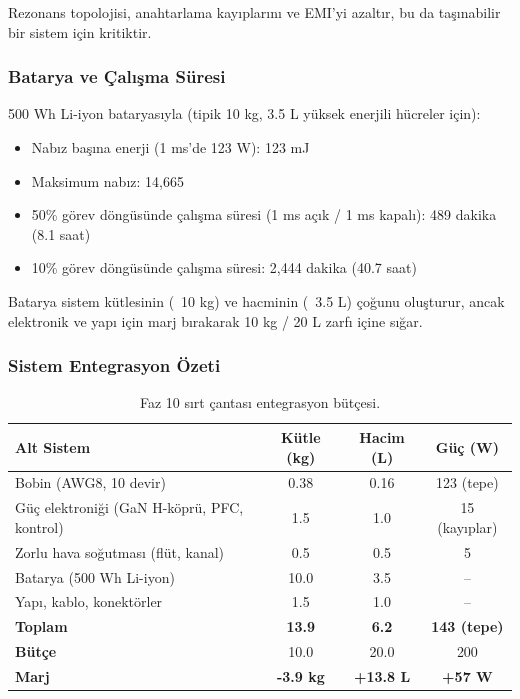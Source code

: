 Rezonans topolojisi, anahtarlama kayıplarını ve EMI'yi azaltır, bu da taşınabilir bir sistem için kritiktir.

\subsubsection{Batarya ve Çalışma Süresi}

500 Wh Li-iyon bataryasıyla (tipik 10 kg, 3.5 L yüksek enerjili hücreler için):

\begin{itemize}
    \item Nabız başına enerji (1 ms'de 123 W): 123 mJ
    \item Maksimum nabız: 14,665
    \item 50\% görev döngüsünde çalışma süresi (1 ms açık / 1 ms kapalı): 489 dakika (8.1 saat)
    \item 10\% görev döngüsünde çalışma süresi: 2,444 dakika (40.7 saat)
\end{itemize}

Batarya sistem kütlesinin (~10 kg) ve hacminin (~3.5 L) çoğunu oluşturur, ancak elektronik ve yapı için marj bırakarak 10 kg / 20 L zarfı içine sığar.

\subsubsection{Sistem Entegrasyon Özeti}

\begin{table}[t]
\centering
\caption{Faz 10 sırt çantası entegrasyon bütçesi.}
\label{tab:phase10-backpack-tr}
\begin{tabular}{lccc}
\hline
Alt Sistem & Kütle (kg) & Hacim (L) & Güç (W) \\
\hline
Bobin (AWG8, 10 devir) & 0.38 & 0.16 & 123 (tepe) \\
Güç elektroniği (GaN H-köprü, PFC, kontrol) & 1.5 & 1.0 & 15 (kayıplar) \\
Zorlu hava soğutması (flüt, kanal) & 0.5 & 0.5 & 5 \\
Batarya (500 Wh Li-iyon) & 10.0 & 3.5 & -- \\
Yapı, kablo, konektörler & 1.5 & 1.0 & -- \\
\hline
\textbf{Toplam} & \textbf{13.9} & \textbf{6.2} & \textbf{143 (tepe)} \\
\textbf{Bütçe} & 10.0 & 20.0 & 200 \\
\textbf{Marj} & \textbf{-3.9 kg} & \textbf{+13.8 L} & \textbf{+57 W} \\
\hline
\end{tabular}
\end{table}

